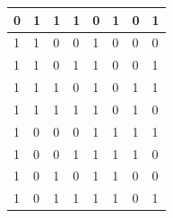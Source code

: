 \documentclass[11pt]{article}
\begin{document}
\begin{table}[H]
\begin{tabular}{|llll||llll|}
		\multicolumn{1}{|l|}{0}                  & \multicolumn{1}{l|}{1}                    & \multicolumn{1}{l|}{1}     & 1     & \multicolumn{1}{l|}{0}     & \multicolumn{1}{l|}{1}     & \multicolumn{1}{l|}{0}     & 1     \\ \hline
		\multicolumn{1}{|l|}{1}                  & \multicolumn{1}{l|}{1}                    & \multicolumn{1}{l|}{0}     & 0     & \multicolumn{1}{l|}{1}     & \multicolumn{1}{l|}{0}     & \multicolumn{1}{l|}{0}     & 0     \\ \hline
		\multicolumn{1}{|l|}{1}                  & \multicolumn{1}{l|}{1}                    & \multicolumn{1}{l|}{0}     & 1     & \multicolumn{1}{l|}{1}     & \multicolumn{1}{l|}{0}     & \multicolumn{1}{l|}{0}     & 1     \\ \hline
		\multicolumn{1}{|l|}{1}                  & \multicolumn{1}{l|}{1}                    & \multicolumn{1}{l|}{1}     & 0     & \multicolumn{1}{l|}{1}     & \multicolumn{1}{l|}{0}     & \multicolumn{1}{l|}{1}     & 1     \\ \hline
		\multicolumn{1}{|l|}{1}                  & \multicolumn{1}{l|}{1}                    & \multicolumn{1}{l|}{1}     & 1     & \multicolumn{1}{l|}{1}     & \multicolumn{1}{l|}{0}     & \multicolumn{1}{l|}{1}     & 0     \\ \hline
		\multicolumn{1}{|l|}{1}                  & \multicolumn{1}{l|}{0}                    & \multicolumn{1}{l|}{0}     & 0     & \multicolumn{1}{l|}{1}     & \multicolumn{1}{l|}{1}     & \multicolumn{1}{l|}{1}     & 1     \\ \hline
		\multicolumn{1}{|l|}{1}                  & \multicolumn{1}{l|}{0}                    & \multicolumn{1}{l|}{0}     & 1     & \multicolumn{1}{l|}{1}     & \multicolumn{1}{l|}{1}     & \multicolumn{1}{l|}{1}     & 0     \\ \hline
		\multicolumn{1}{|l|}{1}                  & \multicolumn{1}{l|}{0}                    & \multicolumn{1}{l|}{1}     & 0     & \multicolumn{1}{l|}{1}     & \multicolumn{1}{l|}{1}     & \multicolumn{1}{l|}{0}     & 0     \\ \hline
		\multicolumn{1}{|l|}{1}                  & \multicolumn{1}{l|}{0}                    & \multicolumn{1}{l|}{1}     & 1     & \multicolumn{1}{l|}{1}     & \multicolumn{1}{l|}{1}     & \multicolumn{1}{l|}{0}     & 1     \\ \hline
	\end{tabular}
\end{table}
\end{document}
